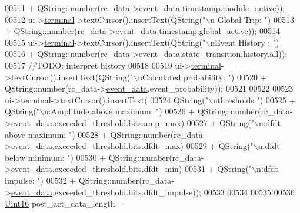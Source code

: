 \begin{DoxyCode}
00511                            + QString::number(rc\_data->\hyperlink{a00019_a5a700ec4c240f4e86c5fb61aef8d983e}{event\_data}.timestamp.module\_active));
00512         ui->\hyperlink{a00080_aae71c46ea4546df5994735dee573b2dd}{terminal}->textCursor().insertText(QString(\textcolor{stringliteral}{"\(\backslash\)n      Global Trip: "})
00513                            + QString::number(rc\_data->\hyperlink{a00019_a5a700ec4c240f4e86c5fb61aef8d983e}{event\_data}.timestamp.global\_active));
00514 
00515         ui->\hyperlink{a00080_aae71c46ea4546df5994735dee573b2dd}{terminal}->textCursor().insertText(QString(\textcolor{stringliteral}{"\(\backslash\)nEvent History : "})
00516                            + QString::number(rc\_data->\hyperlink{a00019_a5a700ec4c240f4e86c5fb61aef8d983e}{event\_data}.state\_transition.history.all));
00517          \textcolor{comment}{//TODO: interpret history}
00518 
00519         ui->\hyperlink{a00080_aae71c46ea4546df5994735dee573b2dd}{terminal}->textCursor().insertText(QString(\textcolor{stringliteral}{"\(\backslash\)nCalculated probability: "})
00520                            + QString::number(rc\_data->\hyperlink{a00019_a5a700ec4c240f4e86c5fb61aef8d983e}{event\_data}.event\_probability));
00521   
00522 
00523         ui->\hyperlink{a00080_aae71c46ea4546df5994735dee573b2dd}{terminal}->textCursor().insertText(
00524                       QString(\textcolor{stringliteral}{"\(\backslash\)nthresholds                       "})
00525                     + QString(\textcolor{stringliteral}{"\(\backslash\)n:Amplitude above maximum: "})
00526                     + QString::number(rc\_data->\hyperlink{a00019_a5a700ec4c240f4e86c5fb61aef8d983e}{event\_data}.exceeded\_threshold.bits.amp\_max)
00527                     + QString(\textcolor{stringliteral}{"\(\backslash\)n:dfdt above maximum: "})
00528                     + QString::number(rc\_data->\hyperlink{a00019_a5a700ec4c240f4e86c5fb61aef8d983e}{event\_data}.exceeded\_threshold.bits.dfdt\_max)
00529                     + QString(\textcolor{stringliteral}{"\(\backslash\)n:dfdt below minimum: "})
00530                     + QString::number(rc\_data->\hyperlink{a00019_a5a700ec4c240f4e86c5fb61aef8d983e}{event\_data}.exceeded\_threshold.bits.dfdt\_min)
00531                     + QString(\textcolor{stringliteral}{"\(\backslash\)n:dfdt impulse: "})
00532                     + QString::number(rc\_data->\hyperlink{a00019_a5a700ec4c240f4e86c5fb61aef8d983e}{event\_data}.exceeded\_threshold.bits.dfdt\_impulse));
00533 
00534 
00535 
00536         \hyperlink{a00004_aae7407b021d43f7193a81a58cfb3e297}{Uint16} post\_act\_data\_length =

\end{DoxyCode}
